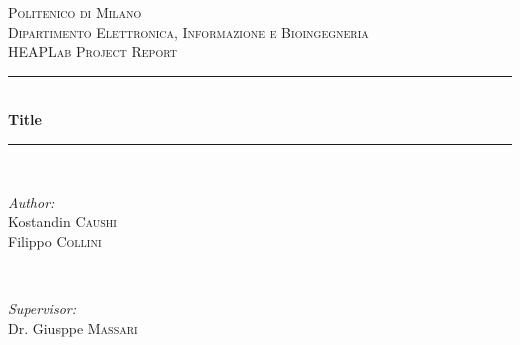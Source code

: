 



\begin{titlepage}

\newcommand{\HRule}{\rule{\linewidth}{0.5mm}} 

\center %
 

\textsc{\LARGE Politenico di Milano}\\[1.5cm] %
\textsc{\Large Dipartimento Elettronica, Informazione e Bioingegneria}\\[0.5cm] %
\textsc{\large HEAPLab Project Report}\\[0.5cm] %


\HRule \\[0.4cm]
{ \huge \bfseries Title}\\[0.4cm] %
\HRule \\[1.5cm]
 

\begin{minipage}{0.4\textwidth}
\begin{flushleft} \large
\emph{Author:}\\
Kostandin \textsc{Caushi}\\
Filippo \textsc{Collini}
\end{flushleft}
\end{minipage}
~
\begin{minipage}{0.4\textwidth}
\begin{flushright} \large
\emph{Supervisor:} \\
Dr. Giusppe \textsc{Massari} %
\end{flushright}
\end{minipage}\\[2cm]


\end{titlepage}
